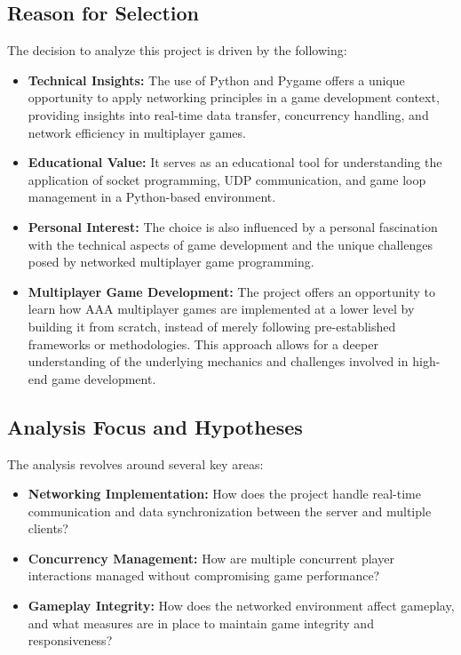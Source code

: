 \subsection{Reason for Selection}

The decision to analyze this project is driven by the following:
\begin{itemize}
    \item \textbf{Technical Insights:} The use of Python and Pygame \cite{pygame} offers a unique opportunity to apply networking principles in a game development context, providing insights into real-time data transfer, concurrency handling, and network efficiency in multiplayer games.
    \item \textbf{Educational Value:} It serves as an educational tool for understanding the application of socket programming, UDP communication, and game loop management in a Python-based environment.
    \item \textbf{Personal Interest:} The choice is also influenced by a personal fascination with the technical aspects of game development and the unique challenges posed by networked multiplayer game programming.
    \item \textbf{Multiplayer Game Development:} The project offers an opportunity to learn how AAA multiplayer games are implemented at a lower level by building it from scratch, instead of merely following pre-established frameworks or methodologies. This approach allows for a deeper understanding of the underlying mechanics and challenges involved in high-end game development.
\end{itemize}

\subsection{Analysis Focus and Hypotheses}

The analysis revolves around several key areas:

\begin{itemize}
    \item \textbf{Networking Implementation:} How does the project handle real-time communication and data synchronization between the server and multiple clients?
    \item \textbf{Concurrency Management:} How are multiple concurrent player interactions managed without compromising game performance?
    \item \textbf{Gameplay Integrity:} How does the networked environment affect gameplay, and what measures are in place to maintain game integrity and responsiveness?
\end{itemize}

